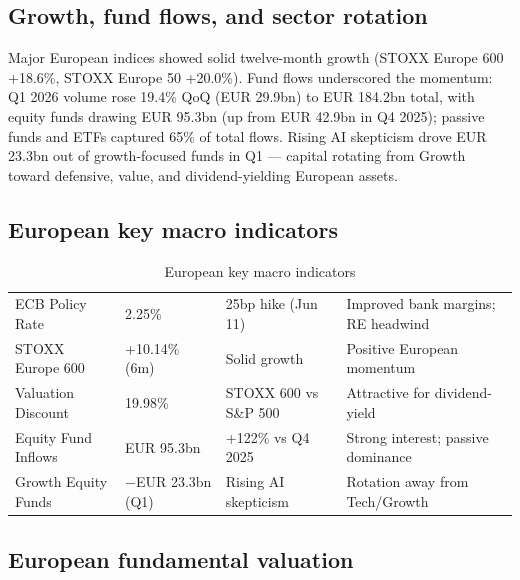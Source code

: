 \documentclass[11pt,a4paper]{article}
\begin{document}
\subsection{Growth, fund flows, and sector rotation}

Major European indices showed solid twelve-month growth (STOXX Europe 600 +18.6\%, STOXX Europe 50 +20.0\%). Fund flows underscored the momentum: Q1 2026 volume rose 19.4\% QoQ (EUR 29.9bn) to EUR 184.2bn total, with equity funds drawing EUR 95.3bn (up from EUR 42.9bn in Q4 2025); passive funds and ETFs captured 65\% of total flows. Rising AI skepticism drove EUR 23.3bn out of growth-focused funds in Q1 --- capital rotating from Growth toward defensive, value, and dividend-yielding European assets.


\subsection{European key macro indicators}

\begin{table}[htbp]
\caption{European key macro indicators}
\small
\begin{tabularx}{\linewidth}{P{3.2cm} P{3.1cm} P{3.2cm} L}
\toprule
{} &  &  &  \\
\midrule
ECB Policy Rate & 2.25\% & 25bp hike (Jun 11) & Improved bank margins; RE headwind \\
STOXX Europe 600 & +10.14\% (6m) & Solid growth & Positive European momentum \\
Valuation Discount & 19.98\% & STOXX 600 vs S\&P 500 & Attractive for dividend-yield \\
Equity Fund Inflows & EUR 95.3bn & +122\% vs Q4 2025 & Strong interest; passive dominance \\
Growth Equity Funds & \(-\)EUR 23.3bn (Q1) & Rising AI skepticism & Rotation away from Tech/Growth \\
\bottomrule
\end{tabularx}
\end{table}

\subsection{European fundamental valuation}
\end{document}
